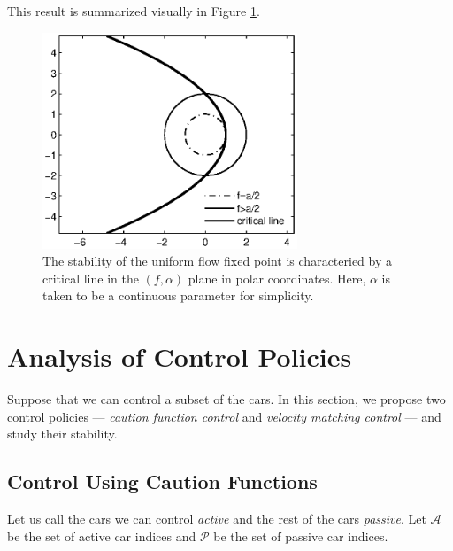 \documentclass[10pt,twocolumn]{article}
\theoremstyle{ss}
\newcommand{\lm}{\fontfamily{\sfdefault}\selectfont}
\begin{document}
This result is summarized visually in Figure \ref{fig:stblregion}.

\begin{figure}[!h]
\lm
\begin{center}
\includegraphics[width=3in]{stblregion}
\end{center}
\caption{ \label{fig:stblregion} The stability of the uniform flow fixed point is characteried by a critical line in the $(f,\alpha)$ plane in polar coordinates. Here, $\alpha$ is taken to be a continuous parameter for simplicity.}
\end{figure}

\section{Analysis of Control Policies}
Suppose that we can control a subset of the cars. In this section, we propose two control policies --- {\em caution function control} and {\em velocity matching control} --- and study their stability.

\subsection{Control Using Caution Functions}
Let us call the cars we can control {\em active} and the rest of the cars {\em passive}. Let $\mathcal{A}$ be the set of active car indices and $\mathcal{P}$ be the set of passive car indices. 
\end{document}
